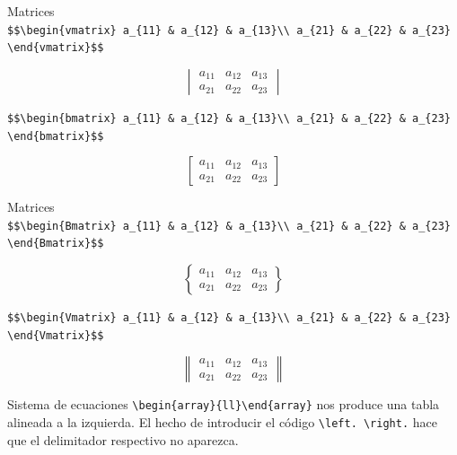 \documentclass[
  ignorenonframetext,
  aspectratio=169]{beamer}
\begin{document}
\begin{frame}[fragile]{Matrices}
\protect\hypertarget{matrices-1}{}
\texttt{\$\$\textbackslash{}begin\{vmatrix\}\ a\_\{11\}\ \&\ a\_\{12\}\ \&\ a\_\{13\}\textbackslash{}\textbackslash{}\ a\_\{21\}\ \&\ a\_\{22\}\ \&\ a\_\{23\}\ \textbackslash{}end\{vmatrix\}\$\$}

\[\begin{vmatrix}
a_{11} & a_{12} & a_{13}\\
a_{21} & a_{22} & a_{23}
\end{vmatrix}\]

\texttt{\$\$\textbackslash{}begin\{bmatrix\}\ a\_\{11\}\ \&\ a\_\{12\}\ \&\ a\_\{13\}\textbackslash{}\textbackslash{}\ a\_\{21\}\ \&\ a\_\{22\}\ \&\ a\_\{23\}\ \textbackslash{}end\{bmatrix\}\$\$}

\[\begin{bmatrix}
a_{11} & a_{12} & a_{13}\\
a_{21} & a_{22} & a_{23}
\end{bmatrix}\]
\end{frame}

\begin{frame}[fragile]{Matrices}
\protect\hypertarget{matrices-2}{}
\texttt{\$\$\textbackslash{}begin\{Bmatrix\}\ a\_\{11\}\ \&\ a\_\{12\}\ \&\ a\_\{13\}\textbackslash{}\textbackslash{}\ a\_\{21\}\ \&\ a\_\{22\}\ \&\ a\_\{23\}\ \textbackslash{}end\{Bmatrix\}\$\$}

\[\begin{Bmatrix}
a_{11} & a_{12} & a_{13}\\
a_{21} & a_{22} & a_{23}
\end{Bmatrix}\]

\texttt{\$\$\textbackslash{}begin\{Vmatrix\}\ a\_\{11\}\ \&\ a\_\{12\}\ \&\ a\_\{13\}\textbackslash{}\textbackslash{}\ a\_\{21\}\ \&\ a\_\{22\}\ \&\ a\_\{23\}\ \textbackslash{}end\{Vmatrix\}\$\$}

\[\begin{Vmatrix}
a_{11} & a_{12} & a_{13}\\
a_{21} & a_{22} & a_{23}
\end{Vmatrix}\]
\end{frame}

\begin{frame}[fragile]{Sistema de ecuaciones}
\protect\hypertarget{sistema-de-ecuaciones}{}
\texttt{\textbackslash{}begin\{array\}\{ll\}\textbackslash{}end\{array\}}
nos produce una tabla alineada a la izquierda. El hecho de introducir el
código \texttt{\textbackslash{}left.\ \textbackslash{}right.} hace que
el delimitador respectivo no aparezca.
\end{frame}
\end{document}
